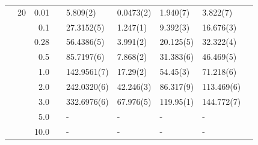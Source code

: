 \begin{table}
\begin{tabularx}{\textwidth}{R{1cm}rrcR{2.3cm}R{2.3cm}R{2.3cm}R{2.3cm}R{1cm}}
		&20 & 0.01 && 5.809(2) & 0.0473(2) & 1.940(7) & 3.822(7) \\
		&& 0.1 && 27.3152(5) & 1.247(1) & 9.392(3) & 16.676(3) \\
		&& 0.28 && 56.4386(5) & 3.991(2) & 20.125(5) & 32.322(4) \\
		&& 0.5 && 85.7197(6) & 7.868(2) & 31.383(6) & 46.469(5) \\
		&& 1.0 && 142.9561(7) & 17.29(2) & 54.45(3) & 71.218(6) \\
		&& 2.0 && 242.0320(6) & 42.246(3) & 86.317(9) & 113.469(6) \\
		&& 3.0 && 332.6976(6) & 67.976(5) & 119.95(1) & 144.772(7) \\ 
		&& 5.0 && - & - & - & - \\
		&& 10.0 && - & - & - & - \\
		\hline \hline
	\end{tabularx}
\end{table}

